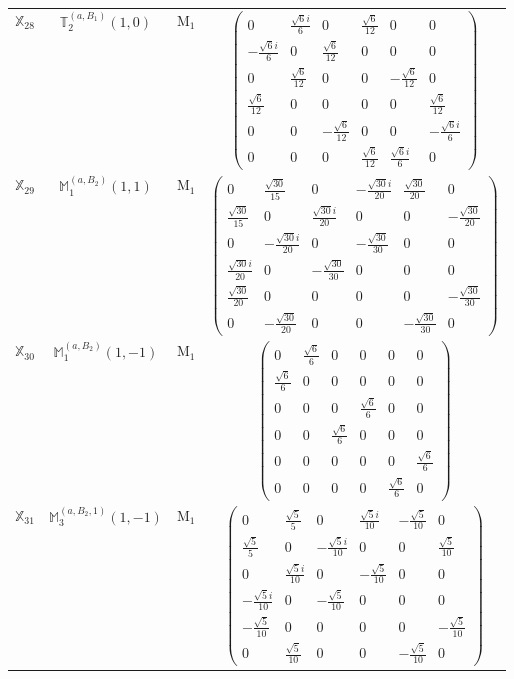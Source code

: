 \documentclass[fleqn,10pt,landscape]{article}
\begin{document}
\begin{itemize}
\begin{center}
\begin{longtable}{c|c|c|c}
$ \mathbb{X}_{28} $ & $\mathbb{T}_{2}^{(a,B_{1})}(1,0)$ & M$_{1}$ & $\begin{pmatrix} 0 & \frac{\sqrt{6} i}{6} & 0 & \frac{\sqrt{6}}{12} & 0 & 0 \\ - \frac{\sqrt{6} i}{6} & 0 & \frac{\sqrt{6}}{12} & 0 & 0 & 0 \\ 0 & \frac{\sqrt{6}}{12} & 0 & 0 & - \frac{\sqrt{6}}{12} & 0 \\ \frac{\sqrt{6}}{12} & 0 & 0 & 0 & 0 & \frac{\sqrt{6}}{12} \\ 0 & 0 & - \frac{\sqrt{6}}{12} & 0 & 0 & - \frac{\sqrt{6} i}{6} \\ 0 & 0 & 0 & \frac{\sqrt{6}}{12} & \frac{\sqrt{6} i}{6} & 0 \end{pmatrix}$ \\
$ \mathbb{X}_{29} $ & $\mathbb{M}_{1}^{(a,B_{2})}(1,1)$ & M$_{1}$ & $\begin{pmatrix} 0 & \frac{\sqrt{30}}{15} & 0 & - \frac{\sqrt{30} i}{20} & \frac{\sqrt{30}}{20} & 0 \\ \frac{\sqrt{30}}{15} & 0 & \frac{\sqrt{30} i}{20} & 0 & 0 & - \frac{\sqrt{30}}{20} \\ 0 & - \frac{\sqrt{30} i}{20} & 0 & - \frac{\sqrt{30}}{30} & 0 & 0 \\ \frac{\sqrt{30} i}{20} & 0 & - \frac{\sqrt{30}}{30} & 0 & 0 & 0 \\ \frac{\sqrt{30}}{20} & 0 & 0 & 0 & 0 & - \frac{\sqrt{30}}{30} \\ 0 & - \frac{\sqrt{30}}{20} & 0 & 0 & - \frac{\sqrt{30}}{30} & 0 \end{pmatrix}$ \\
$ \mathbb{X}_{30} $ & $\mathbb{M}_{1}^{(a,B_{2})}(1,-1)$ & M$_{1}$ & $\begin{pmatrix} 0 & \frac{\sqrt{6}}{6} & 0 & 0 & 0 & 0 \\ \frac{\sqrt{6}}{6} & 0 & 0 & 0 & 0 & 0 \\ 0 & 0 & 0 & \frac{\sqrt{6}}{6} & 0 & 0 \\ 0 & 0 & \frac{\sqrt{6}}{6} & 0 & 0 & 0 \\ 0 & 0 & 0 & 0 & 0 & \frac{\sqrt{6}}{6} \\ 0 & 0 & 0 & 0 & \frac{\sqrt{6}}{6} & 0 \end{pmatrix}$ \\
$ \mathbb{X}_{31} $ & $\mathbb{M}_{3}^{(a,B_{2},1)}(1,-1)$ & M$_{1}$ & $\begin{pmatrix} 0 & \frac{\sqrt{5}}{5} & 0 & \frac{\sqrt{5} i}{10} & - \frac{\sqrt{5}}{10} & 0 \\ \frac{\sqrt{5}}{5} & 0 & - \frac{\sqrt{5} i}{10} & 0 & 0 & \frac{\sqrt{5}}{10} \\ 0 & \frac{\sqrt{5} i}{10} & 0 & - \frac{\sqrt{5}}{10} & 0 & 0 \\ - \frac{\sqrt{5} i}{10} & 0 & - \frac{\sqrt{5}}{10} & 0 & 0 & 0 \\ - \frac{\sqrt{5}}{10} & 0 & 0 & 0 & 0 & - \frac{\sqrt{5}}{10} \\ 0 & \frac{\sqrt{5}}{10} & 0 & 0 & - \frac{\sqrt{5}}{10} & 0 \end{pmatrix}$ \\

\end{longtable}
\end{center}
\end{itemize}
\end{document}
